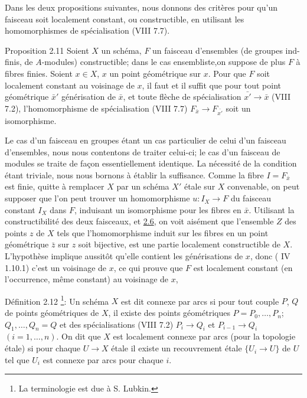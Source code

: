 \documentclass[10pt]{../fichiers-configuration-latex/smfart}
\begin{document}
Dans les deux propositions suivantes, nous donnons des critères pour
qu'un faisceau soit localement constant, ou constructible, en
utilisant les homomorphismes de spécialisation (VIII 7.7).

\begin{enonce*}{Proposition 2.11}
Soient $X$ un schéma, $F$ un faisceau d'ensembles (\resp de groupes
ind-finis, \resp de $A$-modules) constructible; dans le cas
ensembliste,\pageoriginale on suppose de plus $F$ à fibres
finies. Soient $x\in X$, $x$ un point géométrique sur $x$. Pour que
$F$ soit localement constant au voisinage de $x$, il faut et il suffit
que pour tout point géométrique $\bar{x}'$ générisation de $\bar{x}$,
et toute flèche de spécialisation $\bar{x'}\rightarrow \bar{x}$ {\rm
(VIII 7.2)}, l'homomorphisme de spécialisation {\rm (VIII 7.7)}
$F_{\bar{x}}\rightarrow F_{\bar{x'}}$ soit un isomorphisme.
\end{enonce*}

Le cas d'un faisceau en groupes étant un cas particulier de celui d'un
faisceau d'ensembles, nous nous contentons de traiter celui-ci; le cas
d'un faisceau de modules se traite de façon essentiellement
identique. La nécessité de la condition étant triviale, nous nous
bornons à établir la suffisance. Comme la fibre $I=F_{\bar{x}}$ est
finie, quitte à remplacer $X$ par un schéma $X'$ étale sur $X$
convenable, on peut supposer que l'on peut trouver un homomorphisme
$u:I_X\rightarrow F$ du faisceau constant $I_X$ dans $F$, induisant un
isomorphisme pour les fibres en $\bar{x}$. Utilisant la
constructibilité des deux faisceaux, et \hyperref[IX.prop2.6]{2.6}, on voit aisément que
l'ensemble $Z$ des points $z$ de $X$ tels que l'homomorphisme induit
sur les fibres en un point géométrique $\bar{z}$ sur $z$ soit
bijective, est une partie localement constructible de $X$. L'hypothèse
implique aussitôt qu'elle contient les générisations de $x$, donc (\EGA
IV 1.10.1) c'est un voisinage de $x$, ce qui prouve que $F$ est
localement constant (en l'occurrence, même constant) au voisinage de
$x$,\cqfd

\begin{enonce*}{Définition 2.12}
\footnote[1]{La terminologie est due à S. Lubkin.}: Un schéma $X$
est dit connexe par arcs si pour tout couple $P$, $Q$ de points
géométriques de $X$, il existe des points géométriques
$P=P_0,\ldots,P_n$; $Q_1,\ldots,Q_n=Q$ et des spécialisations {\rm
(VIII 7.2)} $P_i\rightarrow Q_i$ et $P_{i-1}\rightarrow
Q_i$ $(i=1,\ldots,n)$. On dit que $X$ est localement connexe par arcs
(pour la topologie étale) si pour chaque $U\rightarrow X$ étale il
existe un recouvrement étale $\{U_i\rightarrow U\}$ de $U$ tel que
$U_i$ est connexe par arcs pour chaque $i$.
\end{enonce*}
\end{document}

